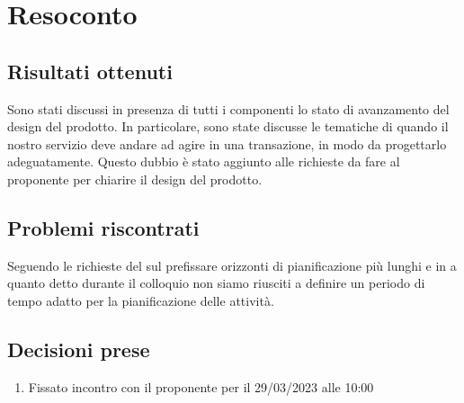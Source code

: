 \section{Resoconto}

\subsection{Risultati ottenuti}
Sono stati discussi in presenza di tutti i componenti lo stato di avanzamento del design del prodotto. In particolare, sono state discusse le tematiche di quando il nostro servizio deve andare ad agire in una transazione, in modo da progettarlo adeguatamente. Questo dubbio è stato aggiunto alle richieste da fare al proponente per chiarire il design del prodotto.

\subsection{Problemi riscontrati}

Seguendo le richieste del \vardanega sul prefissare orizzonti di pianificazione più lunghi e in a quanto detto durante il colloquio \RTB non siamo riusciti a definire un periodo di tempo adatto per la pianificazione delle attività.

\subsection{Decisioni prese}

\begin{enumerate}
    \item Fissato incontro con il proponente per il 29/03/2023 alle 10:00
\end{enumerate}
